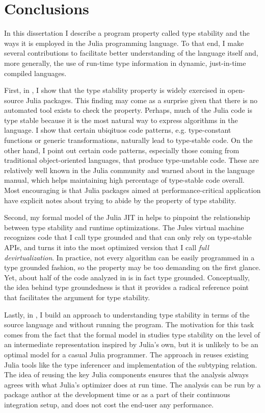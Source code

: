\chapter{Conclusions}%
\label{chap:conc}

In this dissertation I describe a program property called type stability and the
ways it is employed in the Julia programming language. To that end, I make
several contributions to facilitate better understanding of the
language itself and, more generally, the use of run-time type
information in dynamic, just-in-time compiled languages.

First, in , I show that the type stability property is
widely exercised in open-source Julia packages. This finding may come as a
surprise given that there is no automated tool exists to check the property.
Perhaps, much of the Julia code is type stable because it is the most natural
way to express algorithms in the language. I show that certain ubiqituos code
patterns, e.g. type-constant functions or generic transformations, naturally
lead to type-stable code. On the other hand, I point out certain code
patterns, especially those coming from traditional object-oriented languages,
that produce type-unstable code. These are relatively well known in the Julia
community and warned about in the language manual, which helps maintaining high
percentage of type-stable code overall. Most encouraging is that Julia packages
aimed at performance-critical application have explicit notes about trying to
abide by the property of type stability.

Second, my formal model of the Julia JIT in  helps to
pinpoint the relationship between type stability and runtime optimizations. The
Jules virtual machine recognizes code that I call type grounded and that can
only rely on type-stable APIs, and turns it into the most optimized version that
I call \emph{full devirtualization}. In practice, not every algorithm can be
easily programmed in a type grounded fashion, so the property may be too
demanding on the first glance. Yet, about half of the code analyzed in
 is in fact type grounded. Conceptually, the idea behind
type groundedness is that it provides a radical reference point that facilitates
the argument for type stability.

Lastly, in , I build an approach to understanding type
stability in terms of the source language and without running the program. The
motivation for this task comes from the fact that the formal model in
 studies type stability on the level of an intermediate
representation inspired by Julia's own, but it is unlikely to be an optimal
model for a casual Julia programmer. The approach in 
reuses existing Julia tools like the type inferencer and implementation of the
subtyping relation. The idea of reusing the key Julia components ensures that
the analysis always agrees with what Julia's optimizer does at run time. The
analysis can be run by a package author at the development time or as a
part of their continuous integration setup, and does not cost the end-user any
performance.

